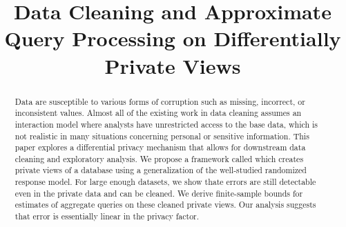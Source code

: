 \documentclass{sig-alternate}
\begin{document}
\newcommand{\reminder}[1]{{{\textcolor{magenta}{\{\{\bf #1\}\}}}\xspace}}
\newcommand{\specialcell}[2][c]{%
  \begin{tabular}[#1]{@{}c@{}}#2\end{tabular}}

\def\ojoin{\setbox0=\hbox{$\bowtie$}%
  \rule[-.02ex]{.25em}{.4pt}\llap{\rule[\ht0]{.25em}{.4pt}}}
\def\leftouterjoin{\mathbin{\ojoin\mkern-5.8mu\bowtie}}
\def\rightouterjoin{\mathbin{\bowtie\mkern-5.8mu\ojoin}}
\def\fullouterjoin{\mathbin{\ojoin\mkern-5.8mu\bowtie\mkern-5.8mu\ojoin}}



\title{Data Cleaning and Approximate Query Processing on Differentially Private Views}



%

\maketitle

\begin{abstract}
Data are susceptible to various forms of corruption such as missing, incorrect, or inconsistent values.
Almost all of the existing work in data cleaning assumes an interaction model where analysts have unrestricted access to the base data, which is not realistic in many situations concerning personal or sensitive information.
This paper explores a differential privacy mechanism that allows for downstream data cleaning and exploratory analysis.
We propose a framework called \sys which creates private views of a database using a generalization of the well-studied randomized response model.
For large enough datasets, we show thate errors are still detectable even in the private data and can be cleaned. 
We derive finite-sample bounds for estimates of aggregate queries on these cleaned private views.
Our analysis suggests that error is essentially linear in the privacy factor.
\end{abstract}






%





%

 
\clearpage
\normalsize \selectfont
\end{document}
